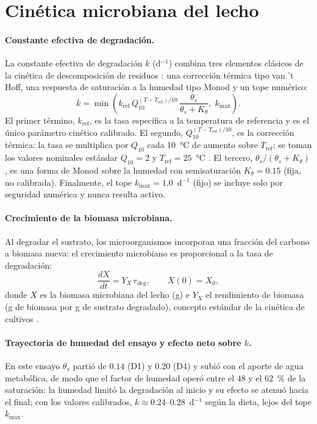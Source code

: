 \documentclass[11pt,a4paper]{article}
\begin{document}
\section{Cinética microbiana del lecho}
\label{sec:micdetalle}

\paragraph{Constante efectiva de degradación.}
La constante efectiva de degradación $k$ (d$^{-1}$) combina tres elementos clásicos de la cinética de descomposición de residuos \parencite{roels1980,shulerbioprocess2017}: una corrección térmica tipo van 't Hoff, una respuesta de saturación a la humedad tipo Monod y un tope numérico:
\begin{equation}
k = \min\!\left(k_{\mathrm{ref}}\,Q_{10}^{(T - T_{\mathrm{ref}})/10}\,
\frac{\theta_s}{\theta_s + K_{\theta}},\; k_{\max}\right).
\label{eq:kmic}
\end{equation}
El primer término, $k_{\mathrm{ref}}$, es la tasa específica a la temperatura de referencia y es el único parámetro cinético calibrado. El segundo, $Q_{10}^{(T - T_{\mathrm{ref}})/10}$, es la corrección térmica: la tasa se multiplica por $Q_{10}$ cada 10~°C de aumento sobre $T_{\mathrm{ref}}$; se toman los valores nominales estándar $Q_{10} = 2$ y $T_{\mathrm{ref}} = 25$~°C \parencite{roels1980,shulerbioprocess2017}. El tercero, $\theta_s/(\theta_s + K_{\theta})$, es una forma de Monod sobre la humedad con semisaturación $K_{\theta} = 0.15$ (fija, no calibrada). Finalmente, el tope $k_{\max} = 1.0$~d$^{-1}$ (fijo) se incluye solo por seguridad numérica y nunca resulta activo.

\paragraph{Crecimiento de la biomasa microbiana.}
Al degradar el sustrato, los microorganismos incorporan una fracción del carbono a biomasa nueva: el crecimiento microbiano es proporcional a la tasa de degradación:
\begin{equation}
\frac{dX}{dt} = Y_X\,r_{\mathrm{deg}},
\qquad X(0) = X_0,
\label{eq:xmic}
\end{equation}
donde $X$ es la biomasa microbiana del lecho (g) e $Y_X$ el rendimiento de biomasa (g de biomasa por g de sustrato degradado), concepto estándar de la cinética de cultivos \parencite{roels1980,shulerbioprocess2017}.

\paragraph{Trayectoria de humedad del ensayo y efecto neto sobre $k$.}
En este ensayo $\theta_s$ partió de $0.14$ (D1) y $0.20$ (D4) y subió con el aporte de agua metabólica, de modo que el factor de humedad operó entre el $48$ y el $62$~\% de la saturación: la humedad limitó la degradación al inicio y su efecto se atenuó hacia el final; con los valores calibrados, $k \approx 0.24$--$0.28$~d$^{-1}$ según la dieta, lejos del tope $k_{\max}$.
\end{document}
